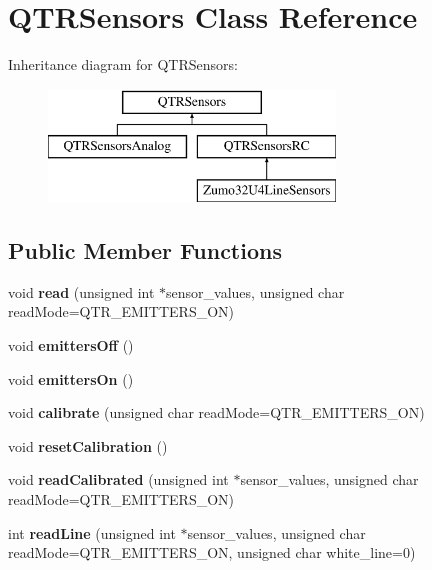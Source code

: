 \hypertarget{class_q_t_r_sensors}{}\section{Q\+T\+R\+Sensors Class Reference}
\label{class_q_t_r_sensors}
Inheritance diagram for Q\+T\+R\+Sensors\+:\begin{figure}[H]
\begin{center}
\leavevmode
\includegraphics[height=3.000000cm]{class_q_t_r_sensors}
\end{center}
\end{figure}
\subsection*{Public Member Functions}
\begin{DoxyCompactItemize}
\item 
\mbox{\label{class_q_t_r_sensors_afc47e6c2608293a610e1a3acce93628b}} 
void {\bfseries read} (unsigned int $\ast$sensor\+\_\+values, unsigned char read\+Mode=Q\+T\+R\+\_\+\+E\+M\+I\+T\+T\+E\+R\+S\+\_\+\+ON)
\item 
\mbox{\label{class_q_t_r_sensors_a576f1fe1e9f2d3d2097baf79a9655134}} 
void {\bfseries emitters\+Off} ()
\item 
\mbox{\label{class_q_t_r_sensors_a79f5380ecdb324a7800a045c3506975f}} 
void {\bfseries emitters\+On} ()
\item 
\mbox{\label{class_q_t_r_sensors_ac9840e2429c7a962977057ba154c77da}} 
void {\bfseries calibrate} (unsigned char read\+Mode=Q\+T\+R\+\_\+\+E\+M\+I\+T\+T\+E\+R\+S\+\_\+\+ON)
\item 
\mbox{\label{class_q_t_r_sensors_aa840b6ef17562d41edf21ddd08e0672e}} 
void {\bfseries reset\+Calibration} ()
\item 
\mbox{\label{class_q_t_r_sensors_aa32a448ac03cd2a45d1f14f96ac4b739}} 
void {\bfseries read\+Calibrated} (unsigned int $\ast$sensor\+\_\+values, unsigned char read\+Mode=Q\+T\+R\+\_\+\+E\+M\+I\+T\+T\+E\+R\+S\+\_\+\+ON)
\item 
\mbox{\label{class_q_t_r_sensors_ac84f0b98bceae0b59d687ae82eb92718}} 
int {\bfseries read\+Line} (unsigned int $\ast$sensor\+\_\+values, unsigned char read\+Mode=Q\+T\+R\+\_\+\+E\+M\+I\+T\+T\+E\+R\+S\+\_\+\+ON, unsigned char white\+\_\+line=0)
\end{DoxyCompactItemize}

